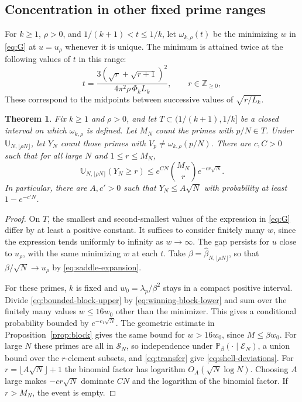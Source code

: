 \documentclass[11pt]{amsart}
\newtheorem{theorem}{Theorem}[section]
\theoremstyle{remark}
\newcommand{\Pp}{\mathbb P}
\newcommand{\Z}{\mathbb Z}
\begin{document}
\subsection{Concentration in other fixed prime ranges}

For \(k\ge1\), \(\rho>0\), and \(1/(k+1)<t\le1/k\), let \(\omega_{k,\rho}(t)\) be the minimizing \(w\) in \eqref{eq:G} at \(u=u_\rho\) whenever it is unique. The minimum is attained twice at the following values of \(t\) in this range:
\[
 t=\frac{3(\sqrt r+\sqrt{r+1})^2}{4\pi^2\rho\,\Phi_k L_k},
 \qquad r\in\Z_{\ge0},
\]
These correspond to the midpoints between successive values of \(\sqrt{r/L_k}\).

\begin{theorem}
\label{thm:fixed-shells}
Fix \(k\ge1\) and \(\rho>0\), and let \(T\subset(1/(k+1),1/k]\) be a closed interval on which \(\omega_{k,\rho}\) is defined. Let \(M_N\) count the primes with \(p/N\in T\). Under \(\mathbb U_{N,\lfloor\rho N\rfloor}\), let \(Y_N\) count those primes with \(V_p\ne\omega_{k,\rho}(p/N)\). There are \(c,C>0\) such that for all large \(N\) and \(1\le r\le M_N\),
\begin{equation}
 \mathbb U_{N,\lfloor\rho N\rfloor}(Y_N\ge r)
 \le e^{CN}\binom{M_N}{r} e^{-cr\sqrt N}.
 \label{eq:shell-deviations}
\end{equation}
In particular, there are \(A,c'>0\) such that \(Y_N\le A\sqrt N\) with probability at least \(1-e^{-c'N}\).
\end{theorem}

\begin{proof}
On \(T\), the smallest and second-smallest values of the expression in \eqref{eq:G} differ by at least a positive constant. It suffices to consider finitely many \(w\), since the expression tends uniformly to infinity as \(w\to\infty\). The gap persists for \(u\) close to \(u_\rho\), with the same minimizing \(w\) at each \(t\). Take \(\beta=\widehat\beta_{N,\lfloor\rho N\rfloor}\), so that \(\beta/\sqrt N\to u_\rho\) by \eqref{eq:saddle-expansion}.

For these primes, \(k\) is fixed and \(w_0=\lambda_p/\beta^2\) stays in a compact positive interval. Divide \eqref{eq:bounded-block-upper} by \eqref{eq:winning-block-lower} and sum over the finitely many values \(w\le16w_0\) other than the minimizer. This gives a conditional probability bounded by \(e^{-c_1\sqrt N}\). The geometric estimate in Proposition~\ref{prop:block} gives the same bound for \(w>16w_0\), since \(M\le \beta w_0\). For large \(N\) these primes are all in \(\mathcal S_N\), so independence under \(\Pp_\beta(\cdot\mid \mathcal E_N)\), a union bound over the \(r\)-element subsets, and \eqref{eq:transfer} give \eqref{eq:shell-deviations}. For \(r=\lfloor A\sqrt N\rfloor+1\) the binomial factor has logarithm \(O_A(\sqrt N\log N)\). Choosing \(A\) large makes \(-cr\sqrt N\) dominate \(CN\) and the logarithm of the binomial factor. If \(r>M_N\), the event is empty.
\end{proof}
\end{document}
